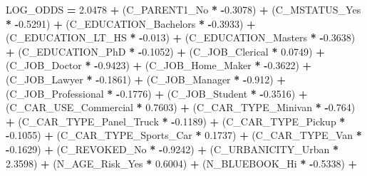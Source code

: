 \documentclass[]{article}
\newenvironment{Shaded}{\begin{snugshade}}{\end{snugshade}}
\newcommand{\KeywordTok}[1]{\textcolor[rgb]{0.13,0.29,0.53}{\textbf{{#1}}}}
\newcommand{\FloatTok}[1]{\textcolor[rgb]{0.00,0.00,0.81}{{#1}}}
\newcommand{\NormalTok}[1]{{#1}}
\begin{document}
\begin{Shaded}
\begin{Highlighting}[]
{{{{{{{{{{{{{{{{{{{{{{{{{{{{{{{{{{{{{{{{{{{{{{{{{{{{{    \NormalTok{LOG_ODDS   }\KeywordTok{=}
    \FloatTok{2.0478}   \KeywordTok{+}
    \NormalTok{(C_PARENT1_No   }\KeywordTok{*}   \KeywordTok{-}\FloatTok{0.3078}\NormalTok{)   }\KeywordTok{+}
    \NormalTok{(C_MSTATUS_Yes   }\KeywordTok{*}   \KeywordTok{-}\FloatTok{0.5291}\NormalTok{)   }\KeywordTok{+}
    \NormalTok{(C_EDUCATION_Bachelors   }\KeywordTok{*}   \KeywordTok{-}\FloatTok{0.3933}\NormalTok{)   }\KeywordTok{+}
    \NormalTok{(C_EDUCATION_LT_HS   }\KeywordTok{*}   \KeywordTok{-}\FloatTok{0.013}\NormalTok{)   }\KeywordTok{+}
    \NormalTok{(C_EDUCATION_Masters   }\KeywordTok{*}   \KeywordTok{-}\FloatTok{0.3638}\NormalTok{)   }\KeywordTok{+}
    \NormalTok{(C_EDUCATION_PhD   }\KeywordTok{*}   \KeywordTok{-}\FloatTok{0.1052}\NormalTok{)   }\KeywordTok{+}
    \NormalTok{(C_JOB_Clerical   }\KeywordTok{*}   \FloatTok{0.0749}\NormalTok{)   }\KeywordTok{+}
    \NormalTok{(C_JOB_Doctor   }\KeywordTok{*}   \KeywordTok{-}\FloatTok{0.9423}\NormalTok{)   }\KeywordTok{+}
    \NormalTok{(C_JOB_Home_Maker   }\KeywordTok{*}   \KeywordTok{-}\FloatTok{0.3622}\NormalTok{)   }\KeywordTok{+}
    \NormalTok{(C_JOB_Lawyer   }\KeywordTok{*}   \KeywordTok{-}\FloatTok{0.1861}\NormalTok{)   }\KeywordTok{+}
    \NormalTok{(C_JOB_Manager   }\KeywordTok{*}   \KeywordTok{-}\FloatTok{0.912}\NormalTok{)   }\KeywordTok{+}
    \NormalTok{(C_JOB_Professional   }\KeywordTok{*}   \KeywordTok{-}\FloatTok{0.1776}\NormalTok{)   }\KeywordTok{+}
    \NormalTok{(C_JOB_Student   }\KeywordTok{*}   \KeywordTok{-}\FloatTok{0.3516}\NormalTok{)   }\KeywordTok{+}
    \NormalTok{(C_CAR_USE_Commercial   }\KeywordTok{*}   \FloatTok{0.7603}\NormalTok{)   }\KeywordTok{+}
    \NormalTok{(C_CAR_TYPE_Minivan   }\KeywordTok{*}   \KeywordTok{-}\FloatTok{0.764}\NormalTok{)   }\KeywordTok{+}
    \NormalTok{(C_CAR_TYPE_Panel_Truck   }\KeywordTok{*}   \KeywordTok{-}\FloatTok{0.1189}\NormalTok{)   }\KeywordTok{+}
    \NormalTok{(C_CAR_TYPE_Pickup   }\KeywordTok{*}   \KeywordTok{-}\FloatTok{0.1055}\NormalTok{)   }\KeywordTok{+}
    \NormalTok{(C_CAR_TYPE_Sports_Car   }\KeywordTok{*}   \FloatTok{0.1737}\NormalTok{)   }\KeywordTok{+}
    \NormalTok{(C_CAR_TYPE_Van   }\KeywordTok{*}   \KeywordTok{-}\FloatTok{0.1629}\NormalTok{)   }\KeywordTok{+}
    \NormalTok{(C_REVOKED_No   }\KeywordTok{*}   \KeywordTok{-}\FloatTok{0.9242}\NormalTok{)   }\KeywordTok{+}
    \NormalTok{(C_URBANICITY_Urban   }\KeywordTok{*}   \FloatTok{2.3598}\NormalTok{)   }\KeywordTok{+}
    \NormalTok{(N_AGE_Risk_Yes   }\KeywordTok{*}   \FloatTok{0.6004}\NormalTok{)   }\KeywordTok{+}
    \NormalTok{(N_BLUEBOOK_Hi   }\KeywordTok{*}   \KeywordTok{-}\FloatTok{0.5338}\NormalTok{)   }\KeywordTok{+}
}}}}}}}}}}}}}}}}}}}}}}}}}}}}}}}}}}}}}}}}}}}}}}}}}}}}}
\end{Highlighting}
\end{Shaded}
\end{document}

